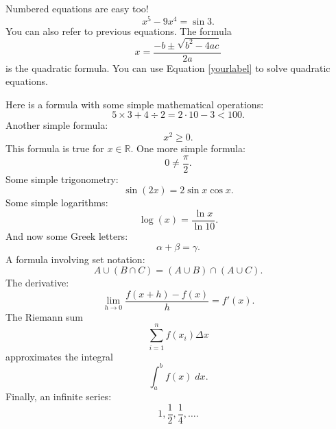 \noindent Numbered equations are easy too!
\begin{equation}
x^{5} - 9x^{4} = \sin 3.
\end{equation}
You can also refer to previous equations.
The formula
\begin{equation}
x = \frac{-b \pm \sqrt{b^{2} - 4ac}}{2a} \label{yourlabel}
\end{equation}
is the quadratic formula.
You can use Equation \ref{yourlabel} to solve quadratic equations.



Here is a formula with some simple mathematical operations:
\[5 \times 3 + 4 \div 2 = 2 \cdot 10 - 3 < 100.\]
Another simple formula:
\[x^{2} \geq 0.\]			%
This formula is true for $x \in \mathbb{R}$.	%
One more simple formula:
\[0 \neq \frac{\pi}{2}.\]
Some simple trigonometry:
\[\sin(2x) = 2 \sin x \cos x.\]
Some simple logarithms:
\[\log(x) = \frac{\ln x}{\ln 10}.\]
And now some Greek letters:
\[\alpha + \beta = \gamma.\]
A formula involving set notation:
\[A \cup (B \cap C) = (A \cup B) \cap (A \cup C).\]
The derivative:
\[\lim_{h \rightarrow 0}\frac{f(x + h) - f(x)}{h} = f'(x).\]
The Riemann sum
\[\sum_{i = 1}^{n}f(x_{i})\Delta x\]
approximates the integral
\[\int_{a}^{b}f(x)\;dx.\]			%
Finally, an infinite series:
\[1, \frac{1}{2}, \frac{1}{4}, \dots.\]

